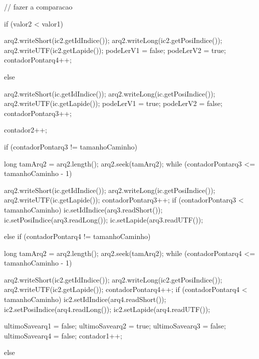 {{{{{{                  }

                  // fazer a comparacao

                  if (valor2 < valor1) {

                    arq2.writeShort(ic2.getIdIndice());
                    arq2.writeLong(ic2.getPosiIndice());
                    arq2.writeUTF(ic2.getLapide());
                    podeLerV1 = false;
                    podeLerV2 = true;
                    contadorPontarq4++;

                  } else {
                    arq2.writeShort(ic.getIdIndice());
                    arq2.writeLong(ic.getPosiIndice());
                    arq2.writeUTF(ic.getLapide());
                    podeLerV1 = true;
                    podeLerV2 = false;
                    contadorPontarq3++;

                  }

                  contador2++;
                }

                if (contadorPontarq3 != tamanhoCaminho) {
                  long tamArq2 = arq2.length();
                  arq2.seek(tamArq2);
                  while (contadorPontarq3 <= tamanhoCaminho - 1) {
                    arq2.writeShort(ic.getIdIndice());
                    arq2.writeLong(ic.getPosiIndice());
                    arq2.writeUTF(ic.getLapide());
                    contadorPontarq3++;
                    if (contadorPontarq3 < tamanhoCaminho) {
                      ic.setIdIndice(arq3.readShort());
                      ic.setPosiIndice(arq3.readLong());
                      ic.setLapide(arq3.readUTF());
                    }

                  }

                } else if (contadorPontarq4 != tamanhoCaminho) {

                  long tamArq2 = arq2.length();
                  arq2.seek(tamArq2);
                  while (contadorPontarq4 <= tamanhoCaminho - 1) {
                    arq2.writeShort(ic2.getIdIndice());
                    arq2.writeLong(ic2.getPosiIndice());
                    arq2.writeUTF(ic2.getLapide());
                    contadorPontarq4++;
                    if (contadorPontarq4 < tamanhoCaminho) {
                      ic2.setIdIndice(arq4.readShort());
                      ic2.setPosiIndice(arq4.readLong());
                      ic2.setLapide(arq4.readUTF());
                    }

                  }
                }
                ultimoSavearq1 = false;
                ultimoSavearq2 = true;
                ultimoSavearq3 = false;
                ultimoSavearq4 = false;
                contador1++;
              } else {

}}}}
